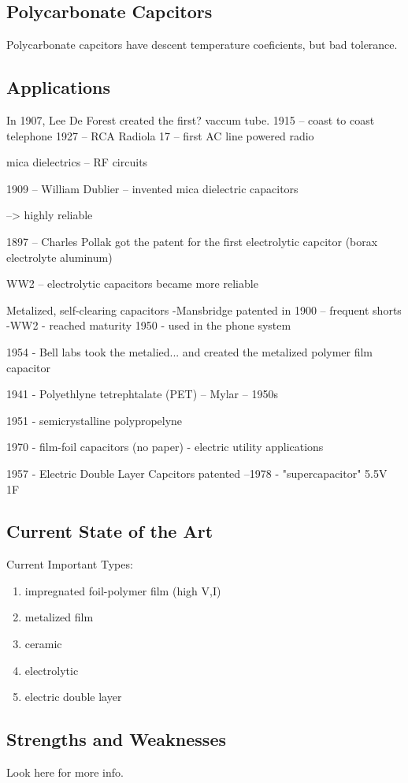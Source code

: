 \subsection{Polycarbonate Capcitors}

Polycarbonate capcitors have descent temperature coeficients, but bad tolerance.  \cite{learn_caps}

\subsection{Applications}

In 1907, Lee De Forest created the first? vaccum tube. \cite{deis_hist}
1915 -- coast to coast telephone
1927 -- RCA Radiola 17 -- first AC line powered radio

mica dielectrics -- RF circuits


1909 -- William Dublier -- invented mica dielectric capacitors


--> highly reliable


1897 -- Charles Pollak got the patent for the first electrolytic capcitor (borax electrolyte aluminum)

WW2 -- electrolytic capacitors became more reliable


Metalized, self-clearing capacitors
-Mansbridge patented in 1900 -- frequent shorts
-WW2 - reached maturity
1950 - used in the phone system

1954 - Bell labs took the metalied... and created the metalized polymer film capacitor

1941 - Polyethlyne  tetrephtalate (PET) -- Mylar -- 1950s

1951 -  semicrystalline polypropelyne 

1970 - film-foil capacitors (no paper) - electric utility applications

1957 - Electric Double Layer Capcitors patented
--1978  - "supercapacitor" 5.5V 1F \cite{deis_hist}

\subsection{Current State of the Art}

Current Important Types: \cite{deis_hist}
\begin{enumerate}
    \item impregnated foil-polymer film (high V,I)
    \item metalized film
    \item ceramic
    \item electrolytic
    \item electric double layer
\end{enumerate}

\subsection{Strengths and Weaknesses}
Look here for more info. \cite{deis_hist}
